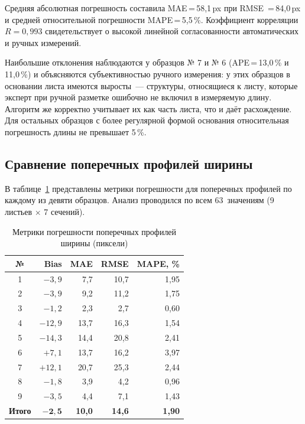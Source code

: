 Средняя абсолютная погрешность составила MAE\,=\,58{,}1\,px при RMSE\, =\,84{,}0\,px
и средней относительной погрешности MAPE\,=\,5{,}5\,\%.
Коэффициент корреляции $R = 0{,}993$ свидетельствует о высокой линейной согласованности
автоматических и ручных измерений.

Наибольшие отклонения наблюдаются у образцов № 7 и № 6
(APE\,=\,13{,}0\,\% и 11{,}0\,\%) и объясняются субъективностью ручного измерения:
у этих образцов в основании листа имеются выросты~--- структуры,
относящиеся к листу, которые эксперт при ручной разметке ошибочно не включил в
измеряемую длину. Алгоритм же корректно учитывает их как часть листа,
что и даёт расхождение. Для остальных образцов с более регулярной формой
основания относительная погрешность длины не превышает 5\,\%.

\subsection{Сравнение поперечных профилей ширины}

В таблице~\ref{tab:cross} представлены метрики погрешности для поперечных профилей
по каждому из девяти образцов. Анализ проводился по всем 63~значениям (9 листьев $\times$ 7 сечений).

\begin{table}[H]
\centering
\caption{Метрики погрешности поперечных профилей ширины (пиксели)}
\label{tab:cross}
\begin{tabular}{crrrr}
\hline
\textbf{№} & \textbf{Bias} & \textbf{MAE} & \textbf{RMSE} & \textbf{MAPE, \%} \\
\hline
1 & $-3{,}9$ &  7{,}7 & 10{,}7 & 1{,}95 \\
2 & $-3{,}9$ &  9{,}2 & 11{,}2 & 1{,}75 \\
3 & $-1{,}2$ &  2{,}3 &  2{,}7 & 0{,}60 \\
4 &$-12{,}9$ & 13{,}7 & 16{,}3 & 1{,}54 \\
5 &$-14{,}3$ & 14{,}4 & 20{,}8 & 2{,}41 \\
6 & $+7{,}1$ & 13{,}7 & 16{,}2 & 3{,}97 \\
7 &$+12{,}1$ & 20{,}7 & 25{,}3 & 2{,}44 \\
8 & $-1{,}8$ &  3{,}9 &  4{,}2 & 0{,}96 \\
9 & $-3{,}5$ &  4{,}4 &  7{,}1 & 1{,}43 \\
\hline
\textbf{Итого} & $\mathbf{-2{,}5}$ & \textbf{10{,}0} & \textbf{14{,}6} & \textbf{1{,}90} \\
\hline
\end{tabular}
\end{table}


